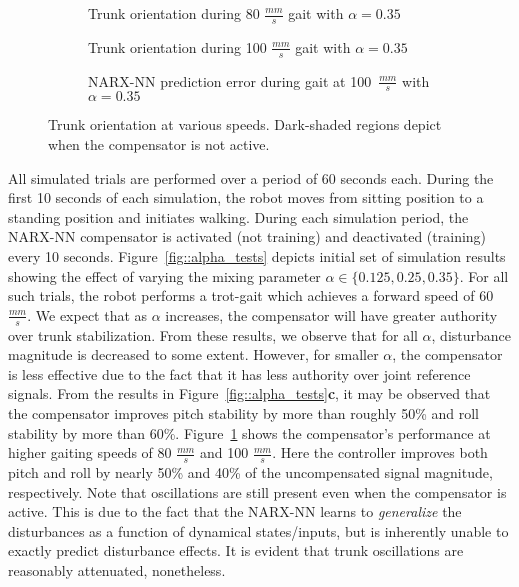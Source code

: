 \begin{figure}[b!]
	\vspace{-5mm}
	\centering
	\begin{subfigure}{0.475\textwidth}
		\centering
		\caption{Trunk orientation during 80 $\frac{mm}{s}$ gait with $\alpha = 0.35$}
	\end{subfigure}
	\begin{subfigure}{0.475\textwidth}
		\centering
		\caption{Trunk orientation during 100 $\frac{mm}{s}$ gait with $\alpha = 0.35$} 
	\end{subfigure}
	\begin{subfigure}{0.475\textwidth}
		\centering
		\caption{\mbox{NARX-NN} prediction error during gait at 100~$\frac{mm}{s}$ with $\alpha = 0.35$} 
	\end{subfigure}
	\caption{Trunk orientation at various speeds. Dark-shaded regions depict when the compensator is not active.}
	\label{fig::fast}
	\vspace{-3mm}
\end{figure}

All simulated trials are performed over a period of 60 seconds each. During the first 10 seconds of each simulation, the robot moves from sitting position to a standing position and initiates walking. During each simulation period, the \mbox{NARX-NN} compensator is activated (not training)  and deactivated (training)  every 10 seconds. Figure~\ref{fig::alpha_tests} depicts initial set of simulation results showing the effect of varying the mixing parameter $\alpha\in\{0.125, 0.25, 0.35\}$. For all such trials, the robot performs a trot-gait which achieves a forward speed of 60 $\frac{mm}{s}$. We expect that as $\alpha$ increases, the compensator will have greater authority over trunk stabilization. From these results, we observe that for all $\alpha$, disturbance magnitude is decreased to some extent. However, for smaller $\alpha$, the compensator is less effective due to the fact that it has less authority over joint reference signals.  From the results in Figure~\ref{fig::alpha_tests}\textbf{c}, it may be observed that the compensator improves pitch stability by more than roughly 50\% and roll stability by more than 60\%. Figure~\ref{fig::fast} shows the compensator's performance at higher gaiting speeds of 80 $\frac{mm}{s}$ and 100 $\frac{mm}{s}$. Here the controller improves both pitch and roll by nearly 50\% and 40\% of the  uncompensated signal magnitude, respectively. Note that oscillations are still present even when the compensator is active. This is due to the fact that the \mbox{NARX-NN} learns to \emph{generalize} the disturbances as a function of dynamical states/inputs, but is inherently unable to exactly predict disturbance effects. It is evident that trunk oscillations are reasonably attenuated, nonetheless.

